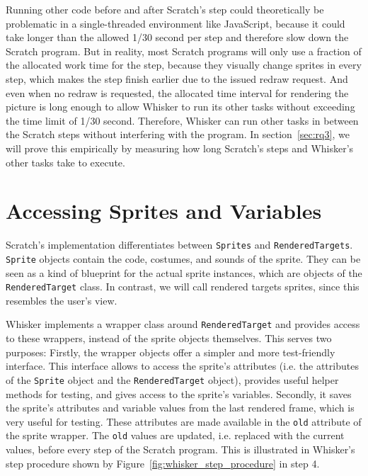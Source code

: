 Running other code before and after Scratch's step could theoretically be problematic in a single-threaded environment like JavaScript,
because it could take longer than the allowed 1/30 second per step and therefore slow down the Scratch program.
But in reality, most Scratch programs will only use a fraction of the allocated work time for the step,
because they visually change sprites in every step, which makes the step finish earlier due to the issued redraw request.
And even when no redraw is requested,
the allocated time interval for rendering the picture is long enough to allow Whisker to run its other tasks without exceeding the time limit of 1/30 second.
Therefore, Whisker can run other tasks in between the Scratch steps without interfering with the program.
In section~\ref{sec:rq3}, we will prove this empirically by measuring how long Scratch's steps and Whisker's other tasks take to execute.

\section{Accessing Sprites and Variables}
\label{sec:accessing_sprites_and_variables}

Scratch's implementation differentiates between \texttt{Sprites} and \texttt{RenderedTargets}.
\texttt{Sprite} objects contain the code, costumes, and sounds of the sprite.
They can be seen as a kind of blueprint for the actual sprite instances, which are objects of the \texttt{RenderedTarget} class.
In contrast, we will call rendered targets sprites, since this resembles the user's view.
\parspace

Whisker implements a wrapper class around \texttt{RenderedTarget}
and provides access to these wrappers, instead of the sprite objects themselves.
This serves two purposes:
Firstly, the wrapper objects offer a simpler and more test-friendly interface.
This interface allows to access the sprite's attributes (i.e. the attributes of the \texttt{Sprite} object and the \texttt{RenderedTarget} object),
provides useful helper methods for testing,
and gives access to the sprite's variables.
Secondly, it saves the sprite's attributes and variable values from the last rendered frame,
which is very useful for testing.
These attributes are made available in the \texttt{old} attribute of the sprite wrapper.
The \texttt{old} values are updated, i.e. replaced with the current values,
before every step of the Scratch program.
This is illustrated in Whisker's step procedure shown by Figure~\ref{fig:whisker_step_procedure} in step 4.
\parspace

